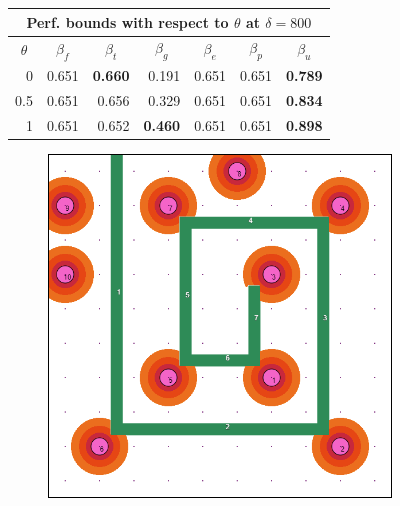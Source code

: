 \documentclass[letterpaper, 10 pt, conference]{ieeeconf}
\begin{document}
\begin{figure}[!t]
\begin{minipage}{\columnwidth}
{\begin{tabular}{|rrrrrrr|}
\multicolumn{7}{|c|}{Perf. bounds with respect to $\theta$ at $\delta=800$} \\ \hline
\multicolumn{1}{|c|}{$\theta$} & \multicolumn{1}{c|}{$\beta_f$} & \multicolumn{1}{c|}{$\beta_t$} & \multicolumn{1}{c|}{$\beta_g$} & \multicolumn{1}{c|}{$\beta_e$} & \multicolumn{1}{c|}{$\beta_p$} & \multicolumn{1}{c|}{$\beta_u$} \\ \hline
\multicolumn{1}{|r|}{0} & \multicolumn{1}{r|}{0.651} & \multicolumn{1}{r|}{\textbf{0.660}} & \multicolumn{1}{r|}{0.191} & \multicolumn{1}{r|}{0.651} & \multicolumn{1}{r|}{0.651} & \textbf{0.789} \\ \hline
\multicolumn{1}{|r|}{0.5} & \multicolumn{1}{r|}{0.651} & \multicolumn{1}{r|}{0.656} & \multicolumn{1}{r|}{0.329} & \multicolumn{1}{r|}{0.651} & \multicolumn{1}{r|}{0.651} & \textbf{0.834} \\ \hline
\multicolumn{1}{|r|}{1} & \multicolumn{1}{r|}{0.651} & \multicolumn{1}{r|}{0.652} & \multicolumn{1}{r|}{\textbf{0.460}} & \multicolumn{1}{r|}{0.651} & \multicolumn{1}{r|}{0.651} & \textbf{0.898} \\ \hline
\end{tabular}%
}
\vspace{0.5mm}
\end{minipage}
\centering
\begin{subfigure}[t]{0.30\columnwidth}
    \centering
    \includegraphics[width=\columnwidth]{Figures/MazeRange50.png}

\end{subfigure}
\end{figure}
\end{document}
